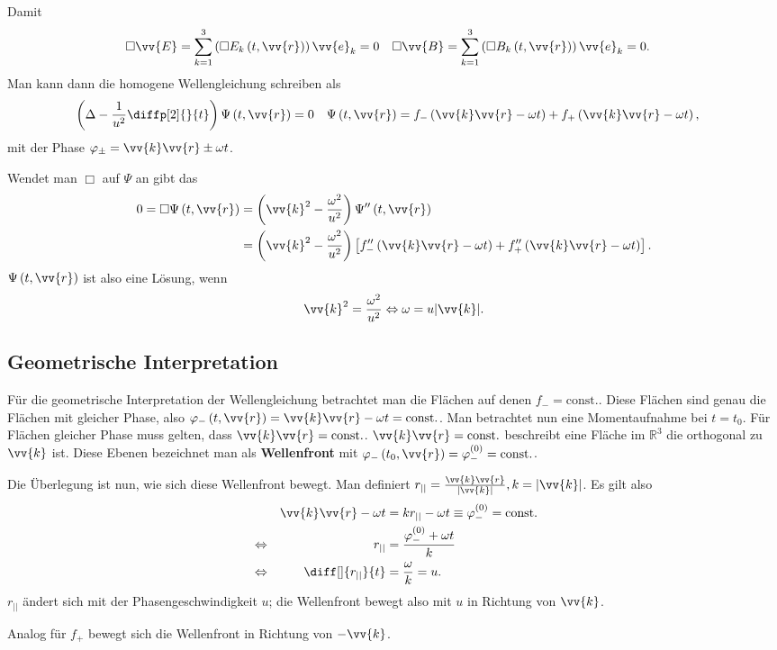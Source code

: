 \documentclass[a4paper,12pt]{article}
\numberwithin{equation}{section}
\begin{document}
Damit 
\begin{align} 
        \Box \vv{E}&=\sum_{k=1}^{3}\left(\Box E_k\left(t,\vv{r}\right)\right)\vv{e}_k=0&\Box \vv{B}&=\sum_{k=1}^{3}\left(\Box B_k\left(t,\vv{r}\right)\right)\vv{e}_k=0
.\end{align} 
Man kann dann die homogene Wellengleichung schreiben als
\begin{align} 
        \left(\Delta -\dfrac{1}{u^2}\diffp[2]{}{t}\right)\Psi \left(t,\vv{r}\right)&=0&\Psi \left(t,\vv{r}\right)&=f_-\left(\vv{k}\vv{r}-\omega t\right)+f_+\left(\vv{k}\vv{r}-\omega t\right)
,\end{align} 
mit der Phase $\varphi _\pm=\vv{k}\vv{r}\pm \omega t$.\par
Wendet man $\Box$ auf $\Psi $ an gibt das
\begin{align} 
        0=\Box \Psi \left(t,\vv{r}\right)&=\left(\vv{k}^2-\dfrac{\omega ^2}{u^2}\right)\Psi ''\left(t,\vv{r}\right)\\
                                       &=\left(\vv{k}^2-\dfrac{\omega ^2}{u^2}\right)\left[f_-''\left(\vv{k}\vv{r}-\omega t\right)+f_+''\left(\vv{k}\vv{r}-\omega t\right)\right]
.\end{align} 
$\Psi \left(t,\vv{r}\right)$ ist also eine Lösung, wenn 
\begin{align} 
        \vv{k}^2=\dfrac{\omega ^2}{u^2}\Leftrightarrow \omega =u|\vv{k}|
.\end{align} 

\subsection{Geometrische Interpretation}
Für die geometrische Interpretation der Wellengleichung betrachtet man die Flächen auf denen $f_-=\text{const.}$.
Diese Flächen sind genau die Flächen mit gleicher Phase, also $\varphi _-\left(t,\vv{r}\right)=\vv{k}\vv{r}-\omega t=\text{const.}$.
Man betrachtet nun eine Momentaufnahme bei $t=t_0$. 
Für Flächen gleicher Phase muss gelten, dass $\vv{k}\vv{r}=\text{const.}$.
$\vv{k}\vv{r}=\text{const.}$ beschreibt eine Fläche im $\mathbb{R}^3$ die orthogonal zu $\vv{k}$ ist. 
Diese Ebenen bezeichnet man als \textbf{Wellenfront} mit $\varphi _-\left(t_0,\vv{r}\right)=\varphi ^{(0)}_-=\text{const.}$.\par
Die Überlegung ist nun, wie sich diese Wellenfront bewegt. 
Man definiert $r_{| |}=\tfrac{\vv{k}\vv{r}}{|\vv{k}|},k=|\vv{k}|$.
Es gilt also
\begin{align} 
        &&\vv{k}\vv{r}-\omega t&=kr_{| |}-\omega t\equiv \varphi _-^{(0)}=\text{const.}\\
        &\Leftrightarrow &r_{| |}&=\dfrac{\varphi _-^{(0)}+\omega t}{k}\\
        &\Leftrightarrow &\diff[]{r_{| |}}{t}&=\dfrac{\omega }{k}=u
.\end{align} 
$r_{| |}$ ändert sich mit der Phasengeschwindigkeit $u$; die Wellenfront bewegt also mit $u$ in Richtung von $\vv{k}$.\par
Analog für $f_+$ bewegt sich die Wellenfront in Richtung von $-\vv{k}$.
\end{document}
